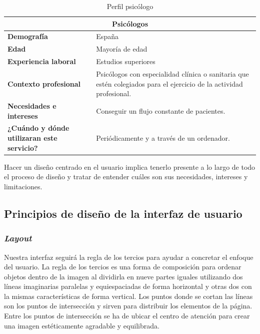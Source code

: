 \begin{table}[htpb]
\centering
\begin{tabularx}{\textwidth}{|X|X|}
\hline
\multicolumn{2}{|c|}{\textbf{Psicólogos}}                                                                                                                                 \\ \hline
\textbf{Demografía}                                & España                                                                                                               \\ \hline
\textbf{Edad}                                      & Mayoría de edad                                                                                                      \\ \hline
\textbf{Experiencia laboral}                       & Estudios superiores                                                                                                  \\ \hline
\textbf{Contexto profesional}                      & Psicólogos con especialidad clínica o sanitaria que estén colegiados para el ejercicio de la actividad profesional. \\ \hline
\textbf{Necesidades e intereses}                   & Conseguir un flujo constante de pacientes.                                                                           \\ \hline
\textbf{¿Cuándo y dónde utilizaran este servicio?} & Periódicamente y a través de un ordenador.                                                                           \\ \hline
\end{tabularx}
\caption{Perfil psicólogo}
\label{perf_psic}
\end{table}


Hacer un diseño centrado en el usuario implica tenerlo presente a lo largo de todo el proceso de diseño y tratar de entender cuáles son sus necesidades, intereses y limitaciones.


\subsection{Principios de diseño de la interfaz de usuario}

\subsubsection{\textit{Layout}}
Nuestra interfaz seguirá la regla de los tercios para ayudar a concretar el enfoque del usuario. La regla de los tercios es una forma de composición para ordenar objetos dentro de la imagen al dividirla en nueve partes iguales utilizando dos líneas imaginarias paralelas y equiespaciadas de forma horizontal y otras dos con la mismas características de forma vertical. Los puntos donde se cortan las líneas son los puntos de intersección y sirven para distribuir los elementos de la página. Entre los puntos de intersección se ha de ubicar el centro de atención para crear una imagen estéticamente agradable y equilibrada\cite{georgefield1845}.


